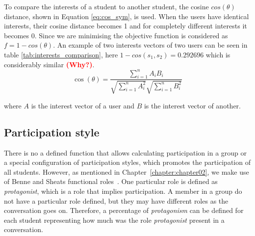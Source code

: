 \begin{table}[]

\caption{Comparison of interests between $s_1$ and $s_2$.}
\label{tab:interests_comparison}

\centering
{}
\end{table}

To compare the interests of a student to another student, the cosine $cos(\theta)$ distance, shown in Equation \ref{eq:cos_sym}, is used. When the users have identical interests, their cosine distance becomes 1 and for completely different interests it becomes 0. Since we are minimising the objective function is considered as $f = 1 - cos(\theta)$. An example of two interests vectors of two users can be seen in table \ref{tab:interests_comparison}, here $1 - cos(s_1,s_2) = 0.292696$ which is considerably similar \textcolor{red}{\bf (Why?)}.\\

\begin{equation} \label{eq:cos_sym}
    \cos(\theta) = \frac{ \sum\limits_{i=1}^{n}{A_i  B_i} }{ \sqrt{\sum\limits_{i=1}^{n}{A_i^2}}  \sqrt{\sum\limits_{i=1}^{n}{B_i^2}} }   
\end{equation}

\noindent where $A$ is the interest vector of a user and $B$ is the interest vector of another.

\subsection{Participation style}


There is no a defined function that allows calculating participation in a group or a special configuration of participation styles, which promotes the participation of all students. 
However, as mentioned in Chapter~\ref{chapter:chapter02}, we make use of Benne and Sheats functional roles~\cite{FunctionalRoles}. One particular role is defined as \textit{protagonist}, which is a role that implies participation. A member in a group do not have a particular role defined, but they may have different roles as the conversation goes on. Therefore, a percentage of \textit{protagonism} can be defined for each student representing how much was the role \textit{protagonist} present in a conversation.\\

